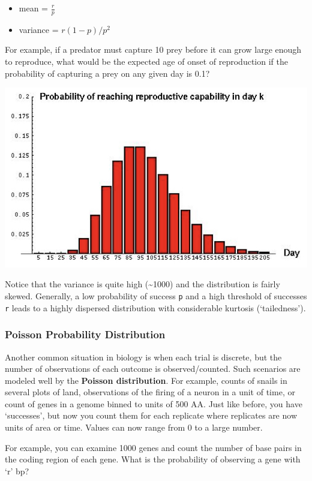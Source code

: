 \documentclass[
]{book}
\providecommand{\tightlist}{%
  \setlength{\itemsep}{0pt}\setlength{\parskip}{0pt}}
\begin{document}
\begin{itemize}
\tightlist
\item
  mean = \(\frac{r}{p}\)
\item
  variance = \(r(1-p)/p^2\)
\end{itemize}

For example, if a predator must capture 10 prey before it can grow large enough to reproduce, what would be the expected age of onset of reproduction if the probability of capturing a prey on any given day is 0.1?

\begin{center}\includegraphics[width=0.5\linewidth]{images/prob.018} \end{center}

Notice that the variance is quite high (\textasciitilde1000) and the distribution is fairly skewed. Generally, a low probability of success \texttt{p} and a high threshold of successes \texttt{r} leads to a highly dispersed distribution with considerable kurtosis (`tailedness').

\hypertarget{poisson-probability-distribution}{%
\subsubsection{\texorpdfstring{\textbf{Poisson Probability Distribution}}{Poisson Probability Distribution}}\label{poisson-probability-distribution}}

Another common situation in biology is when each trial is discrete, but the number of observations of each outcome is observed/counted. Such scenarios are modeled well by the \textbf{Poisson distribution}. For example, counts of snails in several plots of land, observations of the firing of a neuron in a unit of time, or count of genes in a genome binned to units of 500 AA. Just like before, you have `successes', but now you count them for each replicate where replicates are now units of area or time. Values can now range from 0 to a large number.

For example, you can examine 1000 genes and count the number of base pairs in the coding region of each gene. What is the probability of observing a gene with `r' bp?
\end{document}

